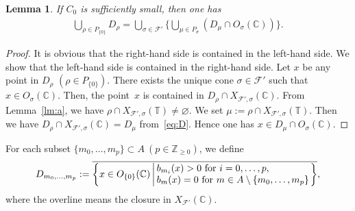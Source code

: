 \documentclass[pdftex]{sigma}
\numberwithin{equation}{section}
\newtheorem{Lemma}[Theorem]{Lemma}
\begin{document}
\begin{Lemma} If $C_0$ is sufficiently small, then one has
\begin{gather*}
\bigcup_{\rho \in P_{\{0\}}} D_\rho = \bigcup_{\sigma \in {\mathcal F}'} \bigg\{\bigcup_{\mu \in P_\sigma} (D_\mu \cap O_\sigma({\mathbb C})) \bigg\}.
\end{gather*}
\end{Lemma}

\begin{proof}
It is obvious that the right-hand side is contained in the left-hand side. We show that the left-hand side is contained in the right-hand side. Let $x$ be any point in $D_\rho$ $(\rho \in P_{\{0\}})$. There exists the unique cone $\sigma \in {\mathcal F}'$ such that $x \in O_\sigma({\mathbb C})$. Then, the point~$x$ is contained in $D_\rho \cap X_{{\mathcal F}',\sigma}({\mathbb C})$. From Lemma~\ref{lm:a}, we have $\rho \cap X_{{\mathcal F}',\sigma}({\mathbb T}) \neq \varnothing$. We set $\mu:=\rho \cap X_{{\mathcal F}',\sigma}({\mathbb T})$. Then we have $D_\rho \cap X_{{\mathcal F}',\sigma}({\mathbb C}) = D_\mu$ from~\eqref{eq:D}. Hence one has $x \in D_\mu \cap O_\sigma({\mathbb C})$.
\end{proof}

For each subset $\{m_0, \dots, m_p\} \subset A \ (p \in {\mathbb Z}_{\geq0})$, we def\/ine
\begin{gather*}
D_{m_0, \dots, m_p}:=
\overline{
\left\{ x \in O_{\{0\}}({\mathbb C}) \left|\,
\begin{array}{@{}l@{}}
b_{m_i}(x)>0\ {\rm for\ } i=0, \dots, p,\\
b_{m}(x)=0\ {\rm for\ } m \in A \setminus \{m_0, \dots, m_{p}\}\\
\end{array}
\right.\right\}
},
\end{gather*}
where the overline means the closure in $X_{{\mathcal F}'}({\mathbb C})$.
\end{document}
